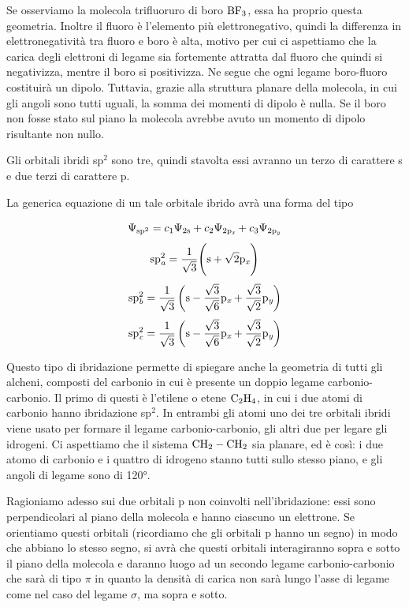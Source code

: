 Se osserviamo la molecola trifluoruro di boro $\rm BF_3$, essa ha proprio questa geometria. Inoltre il fluoro è l'elemento più elettronegativo, quindi la differenza in elettronegatività tra fluoro e boro è alta, motivo per cui ci aspettiamo che la carica degli elettroni di legame sia fortemente attratta dal fluoro che quindi si negativizza, mentre il boro si positivizza. Ne segue che ogni legame boro-fluoro costituirà un dipolo. Tuttavia, grazie alla struttura planare della molecola, in cui gli angoli sono tutti uguali, la somma dei momenti di dipolo è nulla. Se il boro non fosse stato sul piano la molecola avrebbe avuto un momento di dipolo risultante non nullo.

\vspace{0.2cm}Gli orbitali ibridi sp$^2$ sono tre, quindi stavolta essi avranno un terzo di carattere s e due terzi di carattere p.

La generica equazione di un tale orbitale ibrido avrà una forma del tipo

$$\Psi_{\rm sp^2}=c_1\Psi_{\rm 2s} + c_2\Psi_{\rm 2p_\textit{x}} + c_3\Psi_{\rm 2p_\textit{y}}$$
$$\rm sp^2_\textit{a}=\frac{1}{\sqrt{3}}\Biggl(s + \sqrt{2}p_\textit{x}\Biggr)
$$
$$
\rm sp^2_\textit{b}=\frac{1}{\sqrt{3}}\left(s - \frac{\sqrt{3}}{\sqrt{6}}p_\textit{x} +\frac{\sqrt{3}}{\sqrt{2}}p_\textit{y}\right)
$$
$$
\rm sp^2_\textit{c}=\frac{1}{\sqrt{3}}\left(s - \frac{\sqrt{3}}{\sqrt{6}}p_\textit{x} + \frac{\sqrt{3}}{\sqrt{2}}p_\textit{y}\right)
$$

Questo tipo di ibridazione permette di spiegare anche la geometria di tutti gli alcheni, composti del carbonio in cui è presente un doppio legame carbonio-carbonio. Il primo di questi è l'etilene o etene $\rm C_2H_4$, in cui i due atomi di carbonio hanno ibridazione sp$^2$. In entrambi gli atomi uno dei tre orbitali ibridi viene usato per formare il legame carbonio-carbonio, gli altri due per legare gli idrogeni. Ci aspettiamo che il sistema $\rm CH_2-CH_2$ sia planare, ed è così: i due atomo di carbonio e i quattro di idrogeno stanno tutti sullo stesso piano, e gli angoli di legame sono di 120°.

Ragioniamo adesso sui due orbitali p non coinvolti nell'ibridazione: essi sono perpendicolari al piano della molecola e hanno ciascuno un elettrone. Se orientiamo questi orbitali (ricordiamo che gli orbitali p hanno un segno) in modo che abbiano lo stesso segno, si avrà che questi orbitali interagiranno sopra e sotto il piano della molecola e daranno luogo ad un secondo legame carbonio-carbonio che sarà di tipo $\pi$ in quanto la densità di carica non sarà lungo l'asse di legame come nel caso del legame $\sigma$, ma sopra e sotto.

